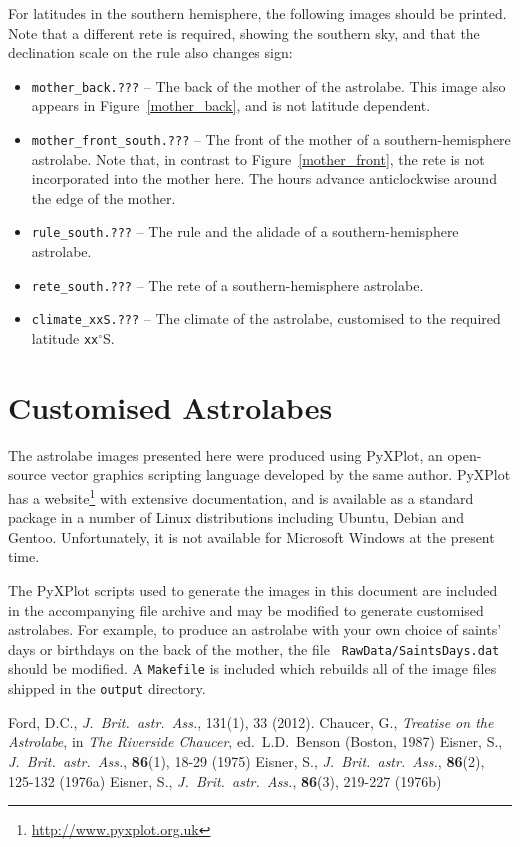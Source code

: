 \documentclass[a4paper,onecolumn,10pt]{article}
\begin{document}
For latitudes in the southern hemisphere, the following images should be
printed. Note that a different rete is required, showing the southern sky,
and that the declination scale on the rule also changes sign:
\begin{itemize}
\item {\tt mother\_back.???} -- The back of the mother of the astrolabe. This image also appears in Figure~\ref{mother_back}, and is not latitude dependent.
\item {\tt mother\_front\_south.???} -- The front of the mother of a southern-hemi\-sp\-here astrolabe. Note that, in contrast to Figure~\ref{mother_front}, the rete is not incorporated into the mother here. The hours advance anticlockwise around the edge of the mother.
\item {\tt rule\_south.???} -- The rule and the alidade of a southern-hemisphere astrolabe.
\item {\tt rete\_south.???} -- The rete of a southern-hemisphere astrolabe.
\item{\tt climate\_xxS.???} -- The climate of the astrolabe, customised to the required latitude {\tt xx}$^\circ$S.
\end{itemize}

\section*{Customised Astrolabes}

The astrolabe images presented here were produced using PyXPlot, an open-source
vector graphics scripting language developed by the same author.  PyXPlot has a
website\footnote{\url{http://www.pyxplot.org.uk}} with extensive documentation,
and is available as a standard package in a number of Linux distributions
including Ubuntu, Debian and Gentoo. Unfortunately, it is not available for
Microsoft Windows at the present time.

The PyXPlot scripts used to generate the images in this document are included
in the accompanying file archive and may be modified to generate customised
astrolabes. For example, to produce an astrolabe with your own choice of
saints' days or birthdays on the back of the mother, the file {\tt
Raw\-Data/\-Saints\-Days\-.dat} should be modified. A {\tt Makefile} is
included which rebuilds all of the image files shipped in the {\tt output}
directory.

\begin{thebibliography}{9}
Ford, D.C., \textit{J.\ Brit.\ astr.\ Ass.}, 131(1), 33 (2012).
Chaucer, G., \textit{Treatise on the Astrolabe}, in {\it The Riverside Chaucer}, ed.\ L.D.\ Benson (Boston, 1987)
Eisner, S., \textit{J.\ Brit.\ astr.\ Ass.}, \textbf{86}(1), 18-29 (1975)
Eisner, S., \textit{J.\ Brit.\ astr.\ Ass.}, \textbf{86}(2), 125-132 (1976a)
Eisner, S., \textit{J.\ Brit.\ astr.\ Ass.}, \textbf{86}(3), 219-227 (1976b)
\end{thebibliography}
\end{document}
